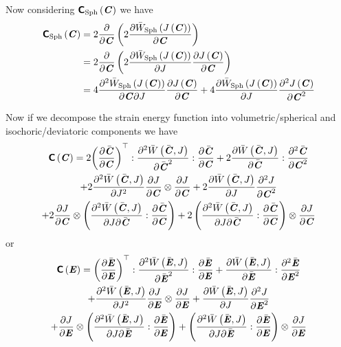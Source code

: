 Now considering $\fnof{\tensorfour{C}_{\Sphop}}{\tensortwo{C}}$ we have
\begin{equation}
  \begin{split}
    \fnof{\tensorfour{C}_{\Sphop}}{\tensortwo{C}}&=2\delby{}{\tensortwo{C}}\pbrac{2\delby{\fnof{\bar{W}_{\Sphop}}{\fnof{J}{\tensortwo{C}}}}{\tensortwo{C}}}\\
    &=2\delby{}{\tensortwo{C}}\pbrac{2\delby{\fnof{\bar{W}_{\Sphop}}{\fnof{J}{\tensortwo{C}}}}{J}\delby{\fnof{J}{\tensortwo{C}}}{\tensortwo{C}}}\\
    &=4\deltwoby{\fnof{\bar{W}_{\Sphop}}{\fnof{J}{\tensortwo{C}}}}{\tensortwo{C}}{J}\delby{\fnof{J}{\tensortwo{C}}}{\tensortwo{C}}+4\delby{\fnof{\bar{W}_{\Sphop}}{\fnof{J}{\tensortwo{C}}}}{J}\deltwosqby{\fnof{J}{\tensortwo{C}}}{\tensortwo{C}}
  \end{split}
\end{equation}

Now if we decompose the strain energy function into volumetric/spherical and
isochoric/deviatoric components we have
\begin{multline}
  \fnof{\tensorfour{C}}{\tensor{C}}=2\doubledotprodthree{\transpose{\pbrac{\delby{\bar{\tensor{C}}}{\tensor{C}}}}}{\deltwosqby{\fnof{\bar{W}}{\bar{\tensor{C}},J}}{\bar{\tensor{C}}}}{\delby{\bar{\tensor{C}}}{\tensor{C}}}+2\doubledotprod{\delby{\fnof{\bar{W}}{\bar{\tensor{C}},J}}{\bar{\tensor{C}}}}{\deltwosqby{\bar{\tensor{C}}}{\tensor{C}}}\\
  +2\deltwosqby{\fnof{\bar{W}}{\bar{\tensor{C}},J}}{J}\tensorprod{\delby{J}{\tensor{C}}}{\delby{J}{\tensor{C}}}+2\delby{\fnof{\bar{W}}{\bar{\tensor{C}},J}}{J}\deltwosqby{J}{\tensor{C}}\\
  +2\tensorprod{\delby{J}{\tensor{C}}}{\pbrac{\doubledotprod{\deltwoby{\fnof{\bar{W}}{\bar{\tensor{C}},J}}{J}{\bar{\tensor{C}}}}{\delby{\bar{\tensor{C}}}{\tensor{C}}}}}+2\tensorprod{\pbrac{\doubledotprod{\deltwoby{\fnof{\bar{W}}{\bar{\tensor{C}},J}}{J}{\bar{\tensor{C}}}}{\delby{\bar{\tensor{C}}}{\tensor{C}}}}}{\delby{J}{\tensor{C}}}
\end{multline}
or
\begin{multline}
  \fnof{\tensorfour{C}}{\tensor{E}}=\doubledotprodthree{\transpose{\pbrac{\delby{\bar{\tensor{E}}}{\tensor{E}}}}}{\deltwosqby{\fnof{\bar{W}}{\bar{\tensor{E}},J}}{\bar{\tensor{E}}}}{\delby{\bar{\tensor{E}}}{\tensor{E}}}+\doubledotprod{\delby{\fnof{\bar{W}}{\bar{\tensor{E}},J}}{\bar{\tensor{E}}}}{\deltwosqby{\bar{\tensor{E}}}{\tensor{E}}}\\
  +\deltwosqby{\fnof{\bar{W}}{\bar{\tensor{E}},J}}{J}\tensorprod{\delby{J}{\tensor{E}}}{\delby{J}{\tensor{E}}}+\delby{\fnof{\bar{W}}{\bar{\tensor{E}},J}}{J}\deltwosqby{J}{\tensor{E}}\\
  +\tensorprod{\delby{J}{\tensor{E}}}{\pbrac{\doubledotprod{\deltwoby{\fnof{\bar{W}}{\bar{\tensor{E}},J}}{J}{\bar{\tensor{E}}}}{\delby{\bar{\tensor{E}}}{\tensor{E}}}}}+\tensorprod{\pbrac{\doubledotprod{\deltwoby{\fnof{\bar{W}}{\bar{\tensor{E}},J}}{J}{\bar{\tensor{E}}}}{\delby{\bar{\tensor{E}}}{\tensor{E}}}}}{\delby{J}{\tensor{E}}}
\end{multline}

